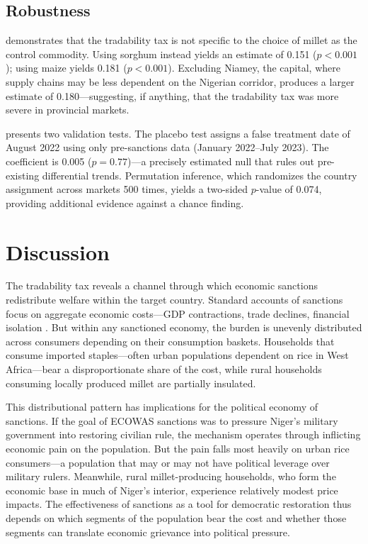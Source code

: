 \documentclass[12pt]{article}
\begin{document}


\subsection{Robustness}

 demonstrates that the tradability tax is not specific to the choice of millet as the control commodity. Using sorghum instead yields an estimate of 0.151 ($p < 0.001$); using maize yields 0.181 ($p < 0.001$). Excluding Niamey, the capital, where supply chains may be less dependent on the Nigerian corridor, produces a larger estimate of 0.180---suggesting, if anything, that the tradability tax was more severe in provincial markets.

 presents two validation tests. The placebo test assigns a false treatment date of August 2022 using only pre-sanctions data (January 2022--July 2023). The coefficient is 0.005 ($p = 0.77$)---a precisely estimated null that rules out pre-existing differential trends. Permutation inference, which randomizes the country assignment across markets 500 times, yields a two-sided $p$-value of 0.074, providing additional evidence against a chance finding.





\section{Discussion}

The tradability tax reveals a channel through which economic sanctions redistribute welfare within the target country. Standard accounts of sanctions focus on aggregate economic costs---GDP contractions, trade declines, financial isolation \citep{hufbauer2007,demarsmichael2016}. But within any sanctioned economy, the burden is unevenly distributed across consumers depending on their consumption baskets. Households that consume imported staples---often urban populations dependent on rice in West Africa---bear a disproportionate share of the cost, while rural households consuming locally produced millet are partially insulated.

This distributional pattern has implications for the political economy of sanctions. If the goal of ECOWAS sanctions was to pressure Niger's military government into restoring civilian rule, the mechanism operates through inflicting economic pain on the population. But the pain falls most heavily on urban rice consumers---a population that may or may not have political leverage over military rulers. Meanwhile, rural millet-producing households, who form the economic base in much of Niger's interior, experience relatively modest price impacts. The effectiveness of sanctions as a tool for democratic restoration thus depends on which segments of the population bear the cost and whether those segments can translate economic grievance into political pressure.
\end{document}
